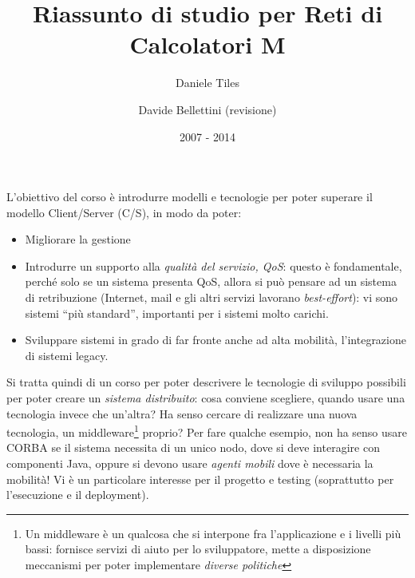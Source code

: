 \documentclass[a4paper,12pt]{article}
\title{Riassunto di studio per Reti di Calcolatori M}
\author{Daniele Tiles \and Davide Bellettini (revisione)}
\date{2007 - 2014}
\begin{document}
\maketitle
\newpage
\tableofcontents
\newpage
L'obiettivo del corso è introdurre modelli e tecnologie per poter superare il modello Client/Server (C/S), in modo 
da poter:
\begin{itemize}
 \item Migliorare la gestione
 \item Introdurre un supporto alla \textit{qualità del servizio, QoS}: questo è fondamentale, perché solo se un sistema
 presenta QoS, allora si può pensare ad un sistema di retribuzione (Internet, mail e gli altri servizi
lavorano \textit{best-effort}): vi sono sistemi ``più standard'', importanti per i sistemi molto carichi.
\item Sviluppare sistemi in grado di far fronte anche ad alta mobilità, l'integrazione di sistemi legacy.
\end{itemize}
Si tratta quindi di un corso per poter descrivere le tecnologie di sviluppo possibili per poter creare un
\textit{sistema distribuito}: cosa conviene scegliere, quando usare una tecnologia invece che un'altra? Ha senso cercare
di realizzare una nuova tecnologia, un middleware\footnote{Un middleware è un qualcosa che si interpone fra
l'applicazione e i livelli più bassi: fornisce servizi di aiuto per lo sviluppatore, mette a disposizione meccanismi per
poter implementare \textit{diverse politiche}} proprio? Per fare qualche esempio, non ha senso usare CORBA se il sistema
necessita di un unico nodo, dove si deve interagire con componenti Java, oppure si devono usare \textit{agenti mobili}
dove è necessaria la mobilità! Vi è un particolare interesse per il progetto e testing (soprattutto per l'esecuzione e
il deployment).










\end{document}
